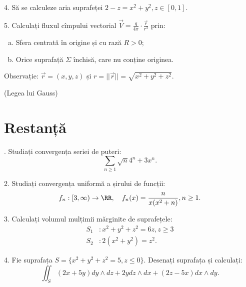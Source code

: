 \vspace{0.5cm}

4. Să se calculeze aria suprafeței $2 - z = x^2 + y^2, z \in [0, 1]$.

\vspace{0.5cm}

5. Calculați fluxul cîmpului vectorial $\vec{V} = \frac{q}{4 \pi} \cdot \frac{\vec{r}}{r^3}$
prin:
\begin{enumerate}[(a)]
\item Sfera centrată în origine și cu rază $R > 0$;
\item Orice suprafață $\Sigma$ închisă, care nu conține originea.
\end{enumerate}
Observație: $\vec{r} = (x, y, z)$ și $r = ||\vec{r}|| = \sqrt{x^2 + y^2 + z^2}$.

(Legea lui Gauss)

\section{Restanță}


\indent{}. Studiați convergența seriei de puteri:
\[
  \sum_{n \geq 1} \sqrt{n}{4^n + 3} x^n.
\]

\vspace{0.5cm}

2. Studiați convergența uniformă a șirului de funcții:
\[
  f_n : [3, \infty) \to \RR, \quad f_n(x) = \frac{n}{x(x^2 + n)}, n \geq 1.
\]

\vspace{0.5cm}

3. Calculați volumul mulțimii mărginite de suprafețele:
\begin{align*}
  S_1 &: x^2 + y^2 + z^2 = 6z, z \geq 3 \\
  S_2 &: 2(x^2 + y^2) = z^2.
\end{align*}

\vspace{0.5cm}

4. Fie suprafața $ S = \{ x^2 + y^2 + z^2 = 5, z \leq 0 \} $.
Desenați suprafața și calculați:
\[
  \iint_S (2x + 5y) dy \wedge dz + 2ydz \wedge dx + (2z - 5x) dx \wedge dy.
\]


